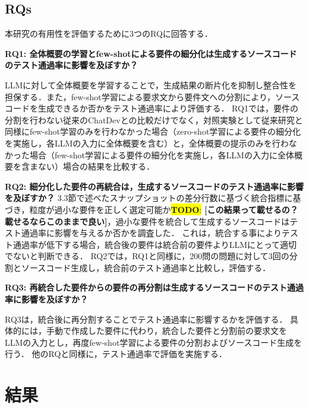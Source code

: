 \documentclass[submit,techrep,noauthor]{ipsj}
\newcommand{\todo}[1]{\colorbox{yellow}{{\bf TODO}:}{\color{red} {\textbf{[#1]}}}}
\begin{document}
\subsection{RQs}
本研究の有用性を評価するために3つのRQに回答する．

\noindent\textbf{RQ1: 全体概要の学習とfew-shotによる要件の細分化は生成するソースコードのテスト通過率に影響を及ぼすか？}

LLMに対して全体概要を学習することで，生成結果の断片化を抑制し整合性を担保する．また，few-shot学習による要求文から要件文への分割により，ソースコードを生成できるか否かをテスト通過率により評価する．
RQ1では，要件の分割を行わない従来のChatDevとの比較だけでなく，対照実験として従来研究\cite{tosem}と同様にfew-shot学習のみを行わなかった場合（zero-shot学習による要件の細分化を実施し，各LLMの入力に全体概要を含む）と，全体概要の提示のみを行わなかった場合（few-shot学習による要件の細分化を実施し，各LLMの入力に全体概要を含まない）場合の結果を比較する．

\noindent\textbf{RQ2: 細分化した要件の再統合は，生成するソースコードのテスト通過率に影響を及ぼすか？}
3.3節で述べたスナップショットの差分行数に基づく統合指標に基づき，粒度が過小な要件を正しく選定可能か\todo{この結果って載せるの？載せるならこのままで良い}，過小な要件を統合して生成するソースコードはテスト通過率に影響を与えるか否かを調査した．
これは，統合する事によりテスト通過率が低下する場合，統合後の要件は統合前の要件よりLLMにとって適切でないと判断できる．
RQ2では，RQ1と同様に，200問の問題に対して3回の分割とソースコード生成し，統合前のテスト通過率と比較し，評価する．


\noindent\textbf{RQ3: 再統合した要件からの要件の再分割は生成するソースコードのテスト通過率に影響を及ぼすか？}

RQ3は，統合後に再分割することでテスト通過率に影響するかを評価する．
具体的には，手動で作成した要件に代わり，統合した要件と分割前の要求文をLLMの入力とし，再度few-shot学習による要件の分割およびソースコード生成を行う．
他のRQと同様に，テスト通過率で評価を実施する．

\section{結果}
\label{sec:result}
\end{document}

